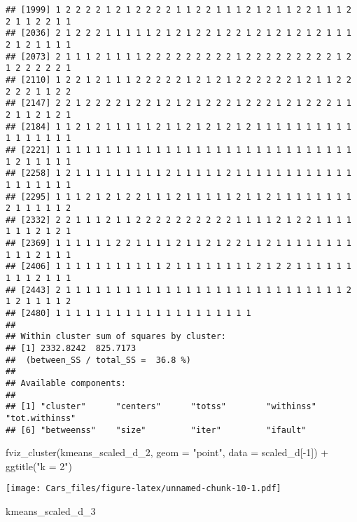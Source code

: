 \documentclass[
]{article}
\newenvironment{Shaded}{\begin{snugshade}}{\end{snugshade}}
\newcommand{\AttributeTok}[1]{\textcolor[rgb]{0.77,0.63,0.00}{#1}}
\newcommand{\DecValTok}[1]{\textcolor[rgb]{0.00,0.00,0.81}{#1}}
\newcommand{\FunctionTok}[1]{\textcolor[rgb]{0.00,0.00,0.00}{#1}}
\newcommand{\NormalTok}[1]{#1}
\newcommand{\SpecialCharTok}[1]{\textcolor[rgb]{0.00,0.00,0.00}{#1}}
\newcommand{\StringTok}[1]{\textcolor[rgb]{0.31,0.60,0.02}{#1}}
\begin{document}
\begin{verbatim}
## [1999] 1 2 2 2 2 1 2 1 2 2 2 2 1 1 2 2 1 1 1 2 1 2 1 1 2 2 1 1 1 2 2 1 1 2 2 1 1
## [2036] 2 1 2 2 2 1 1 1 1 1 2 1 2 1 2 2 1 2 2 1 2 1 2 1 2 1 2 1 1 1 2 1 2 1 1 1 1
## [2073] 2 1 1 1 2 1 1 1 1 2 2 2 2 2 2 2 2 2 1 2 2 2 2 2 2 2 2 2 1 2 1 2 2 2 2 2 1
## [2110] 1 2 2 1 2 1 1 1 2 2 2 2 2 1 2 1 2 1 2 2 2 2 2 2 1 2 1 1 2 2 2 2 2 1 1 2 2
## [2147] 2 2 1 2 2 2 2 1 2 2 1 2 1 2 1 2 2 2 1 2 2 2 1 2 1 2 2 2 1 1 2 1 1 2 1 2 1
## [2184] 1 1 2 1 2 1 1 1 1 1 2 1 1 2 1 2 1 2 1 2 1 1 1 1 1 1 1 1 1 1 1 1 1 1 1 1 1
## [2221] 1 1 1 1 1 1 1 1 1 1 1 1 1 1 1 1 1 1 1 1 1 1 1 1 1 1 1 1 1 1 1 2 1 1 1 1 1
## [2258] 1 2 1 1 1 1 1 1 1 1 1 2 1 1 1 1 1 2 1 1 1 1 1 1 1 1 1 1 1 1 1 1 1 1 1 1 1
## [2295] 1 1 1 2 1 2 1 2 2 1 1 1 2 1 1 1 1 1 2 1 1 2 1 1 1 1 1 1 1 1 2 1 1 1 1 1 2
## [2332] 2 2 1 1 1 2 1 1 2 2 2 2 2 2 2 2 2 2 1 1 1 1 2 1 2 2 1 1 1 1 1 1 1 2 1 2 1
## [2369] 1 1 1 1 1 1 2 2 1 1 1 1 2 1 1 2 1 2 2 1 1 2 1 1 1 1 1 1 1 1 1 1 1 2 1 1 1
## [2406] 1 1 1 1 1 1 1 1 1 1 1 2 1 1 1 1 1 1 1 1 2 1 2 2 1 1 1 1 1 1 1 1 1 2 1 1 1
## [2443] 2 1 1 1 1 1 1 1 1 1 1 1 1 1 1 1 1 1 1 1 1 1 1 1 1 1 1 1 1 2 1 2 1 1 1 1 2
## [2480] 1 1 1 1 1 1 1 1 1 1 1 1 1 1 1 1 1 1 1 1
## 
## Within cluster sum of squares by cluster:
## [1] 2332.8242  825.7173
##  (between_SS / total_SS =  36.8 %)
## 
## Available components:
## 
## [1] "cluster"      "centers"      "totss"        "withinss"     "tot.withinss"
## [6] "betweenss"    "size"         "iter"         "ifault"
\end{verbatim}

\begin{Shaded}
\begin{Highlighting}[]
\FunctionTok{fviz\_cluster}\NormalTok{(kmeans\_scaled\_d\_2, }\AttributeTok{geom =} \StringTok{"point"}\NormalTok{, }\AttributeTok{data =}\NormalTok{ scaled\_d[}\SpecialCharTok{{-}}\DecValTok{1}\NormalTok{]) }\SpecialCharTok{+} \FunctionTok{ggtitle}\NormalTok{(}\StringTok{"k = 2"}\NormalTok{)}
\end{Highlighting}
\end{Shaded}

\texttt{[image: Cars\_files/figure-latex/unnamed-chunk-10-1.pdf]}

\begin{Shaded}
\begin{Highlighting}[]
\NormalTok{kmeans\_scaled\_d\_3}
\end{Highlighting}
\end{Shaded}
\end{document}
